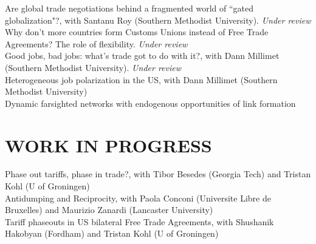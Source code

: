 \documentclass[11pt]{res}
\begin{document}
\begin{resume}
\phantom{.}\vspace{.05cm}
{Are global trade negotiations behind a fragmented world of ``gated globalization"?}, with Santanu Roy (Southern Methodist University). \emph{Under review}\vspace{1.5mm}\\
{Why don't more countries form Customs Unions instead of Free Trade Agreements? The role of flexibility}.\emph{ Under review} \vspace{1.5mm}\\
{Good jobs, bad jobs: what's trade got to do with it?}, with Dann Millimet (Southern Methodist University).\emph{ Under review}\vspace{1.5mm}\\
{Heterogeneous job polarization in the US}, with Dann Millimet (Southern Methodist University)\vspace{1.5mm}\\
{Dynamic farsighted networks with endogenous opportunities of link formation} \vspace{1.5mm}\\

\section{WORK IN PROGRESS}\vspace{1.5mm}
Phase out tariffs, phase in trade?, with Tibor Besedes (Georgia Tech) and Tristan Kohl (U of Groningen) \vspace{1.5mm}\\
Antidumping and Reciprocity, with Paola Conconi (Universite Libre de Bruxelles) and Maurizio Zanardi (Lancaster University) \vspace{1.5mm}\\
Tariff phaseouts in US bilateral Free Trade Agreements, with Shushanik Hakobyan (Fordham) and Tristan Kohl (U of Groningen)\\


\end{resume}
\end{document}
